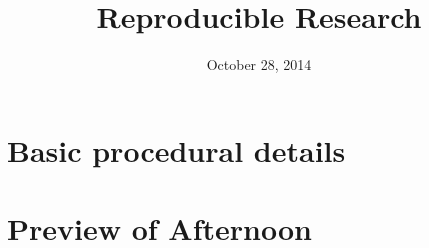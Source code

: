 \documentclass[12pt]{beamer} %
\title{Reproducible Research}
\date[]{October 28, 2014}
\begin{document}
\frame{\titlepage}

\frame{\tableofcontents}

\section{Basic procedural details}
\frame{\tableofcontents[currentsection]}

\section{}
\frame{\tableofcontents[currentsection]}


\section{Preview of Afternoon}
\frame{\tableofcontents[currentsection]}


\appendix
\frame{}
\end{document}
